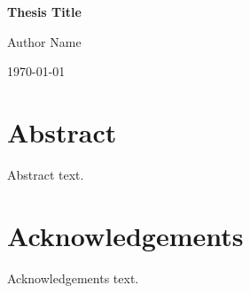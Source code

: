 \begin{titlepage}
\centering
\vspace*{0.25\paperheight}
{\Huge\bfseries Thesis Title\par}
\vspace{1em}
{\Large Author Name\par}
\vfill
{\large \today\par}
\end{titlepage}

\chapter*{Abstract}
Abstract text.

\chapter*{Acknowledgements}
Acknowledgements text.

\tableofcontents
\listoffigures
\listoftables
